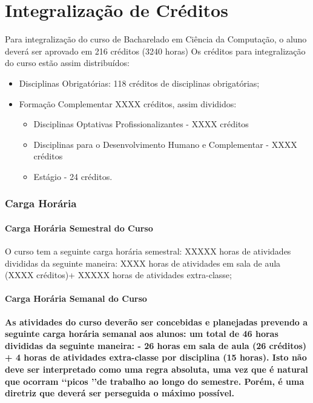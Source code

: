 




\section{Integralização de Créditos}

Para integralização do curso de Bacharelado em Ciência da Computação, o aluno deverá ser aprovado em 216 créditos (3240 horas) Os créditos para integralização do curso estão assim distribuídos:

\begin{itemize}
\item Disciplinas Obrigatórias:  118 créditos de disciplinas obrigatórias;
\item Formação Complementar XXXX créditos, assim divididos:
\begin{itemize}
\item Disciplinas Optativas Profissionalizantes - XXXX créditos
\item Disciplinas para o Desenvolvimento Humano e Complementar - XXXX créditos
\item Estágio - 24 créditos.
\end{itemize}
\end{itemize}


\subsubsection{Carga Horária}

\paragraph{Carga Horária Semestral do Curso}

O curso tem a seguinte carga horária semestral:
 XXXXX horas de atividades divididas da seguinte maneira: XXXX horas de atividades em sala de aula (XXXX créditos)+ XXXXX horas de atividades extra-classe;
 
\paragraph{Carga Horária Semanal do Curso}

\textbf{As atividades do curso deverão ser concebidas e planejadas prevendo a seguinte carga horária semanal aos alunos: um total de 46 horas divididas da seguinte maneira: 
- 26 horas em sala de aula (26 créditos) + 4 horas de atividades extra-classe por disciplina (15 horas). Isto não deve ser interpretado como uma regra absoluta, uma vez que é natural que ocorram \lq\lq picos \rq\rq de trabalho ao longo do semestre. Porém, é uma diretriz que deverá ser perseguida o máximo possível.}




